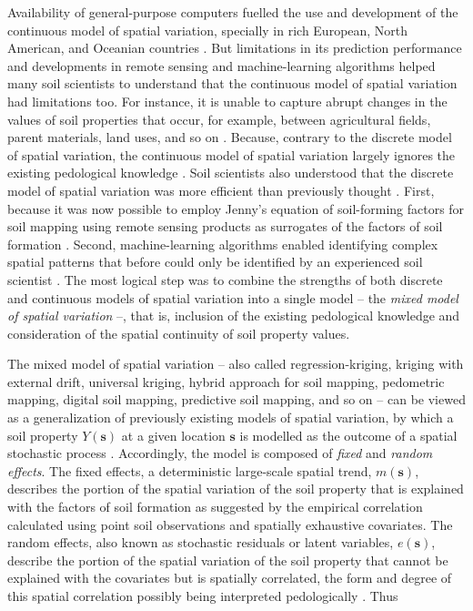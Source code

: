 Availability of general-purpose computers fuelled the use and development of the continuous model of
spatial variation, specially in rich European, North American, and Oceanian countries 
\cite{HeuvelinkEtAl2001,McBratneyEtAl2003,ScullEtAl2003}. But limitations in its prediction 
performance and developments in remote sensing and machine-learning algorithms helped many soil 
scientists to understand that the continuous model of spatial variation had limitations too. For 
instance, it is unable to capture abrupt changes in the values of soil properties that occur, for 
example, between agricultural fields, parent materials, land uses, and so on 
\cite{SteinEtAl1988,VoltzEtAl1990}. Because, contrary to the discrete model of spatial variation, the
continuous model of spatial variation largely ignores the existing pedological knowledge 
\cite{Grunwald2009,Lark2012}. Soil scientists also understood that the discrete model of spatial 
variation was more efficient than previously thought \cite{BregtEtAl1987}. First, because it was now
possible to employ Jenny's equation of soil-forming factors for soil mapping using remote sensing 
products as surrogates of the factors of soil formation \cite{MooreEtAl1993}. Second, machine-learning 
algorithms enabled identifying complex spatial patterns that before could only be identified by an 
experienced soil scientist \cite{McKenzieEtAl1999}. The most logical step was to combine the 
strengths of both discrete and continuous models of spatial variation into a single model -- the 
\emph{mixed model of spatial variation} --, that is, inclusion of the existing pedological 
knowledge and consideration of the spatial continuity of soil property values.

The mixed model of spatial variation -- also called regression-kriging, kriging with external drift,
universal kriging, hybrid approach for soil mapping, pedometric mapping, digital soil mapping, 
predictive soil mapping, and so on \cite{Hengl2003,McBratneyEtAl2003,ScullEtAl2003} -- can be 
viewed as a generalization of previously existing models of spatial variation, by which a soil 
property $Y(\boldsymbol{s})$ at a given location $\boldsymbol{s}$ is modelled as the outcome of a 
spatial stochastic process \cite{Cressie1993,HeuvelinkEtAl2001,LarkEtAl2006}. Accordingly, the 
model is composed of \emph{fixed} and \emph{random effects}. The fixed effects, a deterministic 
large-scale spatial trend, $m(\boldsymbol{s})$, describes the portion of the spatial
variation of the soil property that is explained with the factors of soil formation as suggested by 
the empirical correlation calculated using point soil observations and spatially exhaustive 
covariates. The random effects, also known as stochastic residuals or latent variables, 
$e(\boldsymbol{s})$, describe the portion of the spatial variation of the soil property 
that cannot be explained with the covariates but is spatially correlated, the form and degree of 
this spatial correlation possibly being interpreted pedologically \cite{Lark2012}. Thus


